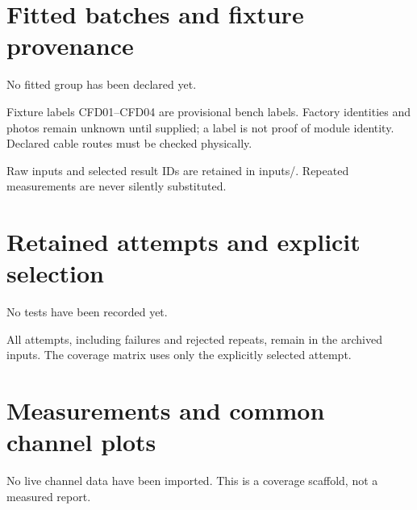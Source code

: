 \section{Fitted batches and fixture provenance}
No fitted group has been declared yet.

Fixture labels CFD01--CFD04 are provisional bench labels. Factory identities and photos remain unknown until supplied; a label is not proof of module identity. Declared cable routes must be checked physically.

Raw inputs and selected result IDs are retained in inputs/. Repeated measurements are never silently substituted.
\section{Retained attempts and explicit selection}
No tests have been recorded yet.

All attempts, including failures and rejected repeats, remain in the archived inputs. The coverage matrix uses only the explicitly selected attempt.
\section{Measurements and common channel plots}
No live channel data have been imported. This is a coverage scaffold, not a measured report.
